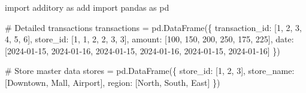 \documentclass[
  letterpaper,
]{scrbook}
\newenvironment{Shaded}{\begin{snugshade}}{\end{snugshade}}
\newcommand{\CommentTok}[1]{\textcolor[rgb]{0.37,0.37,0.37}{#1}}
\newcommand{\DecValTok}[1]{\textcolor[rgb]{0.68,0.00,0.00}{#1}}
\newcommand{\ImportTok}[1]{\textcolor[rgb]{0.00,0.46,0.62}{#1}}
\newcommand{\NormalTok}[1]{\textcolor[rgb]{0.00,0.23,0.31}{#1}}
\newcommand{\OperatorTok}[1]{\textcolor[rgb]{0.37,0.37,0.37}{#1}}
\newcommand{\StringTok}[1]{\textcolor[rgb]{0.13,0.47,0.30}{#1}}
\begin{document}
\begin{Shaded}
\begin{Highlighting}[]
\ImportTok{import}\NormalTok{ additory }\ImportTok{as}\NormalTok{ add}
\ImportTok{import}\NormalTok{ pandas }\ImportTok{as}\NormalTok{ pd}

\CommentTok{\# Detailed transactions}
\NormalTok{transactions }\OperatorTok{=}\NormalTok{ pd.DataFrame(\{}
    \StringTok{\textquotesingle{}transaction\_id\textquotesingle{}}\NormalTok{: [}\DecValTok{1}\NormalTok{, }\DecValTok{2}\NormalTok{, }\DecValTok{3}\NormalTok{, }\DecValTok{4}\NormalTok{, }\DecValTok{5}\NormalTok{, }\DecValTok{6}\NormalTok{],}
    \StringTok{\textquotesingle{}store\_id\textquotesingle{}}\NormalTok{: [}\DecValTok{1}\NormalTok{, }\DecValTok{1}\NormalTok{, }\DecValTok{2}\NormalTok{, }\DecValTok{2}\NormalTok{, }\DecValTok{3}\NormalTok{, }\DecValTok{3}\NormalTok{],}
    \StringTok{\textquotesingle{}amount\textquotesingle{}}\NormalTok{: [}\DecValTok{100}\NormalTok{, }\DecValTok{150}\NormalTok{, }\DecValTok{200}\NormalTok{, }\DecValTok{250}\NormalTok{, }\DecValTok{175}\NormalTok{, }\DecValTok{225}\NormalTok{],}
    \StringTok{\textquotesingle{}date\textquotesingle{}}\NormalTok{: [}\StringTok{\textquotesingle{}2024{-}01{-}15\textquotesingle{}}\NormalTok{, }\StringTok{\textquotesingle{}2024{-}01{-}16\textquotesingle{}}\NormalTok{, }\StringTok{\textquotesingle{}2024{-}01{-}15\textquotesingle{}}\NormalTok{, }
             \StringTok{\textquotesingle{}2024{-}01{-}16\textquotesingle{}}\NormalTok{, }\StringTok{\textquotesingle{}2024{-}01{-}15\textquotesingle{}}\NormalTok{, }\StringTok{\textquotesingle{}2024{-}01{-}16\textquotesingle{}}\NormalTok{]}
\NormalTok{\})}

\CommentTok{\# Store master data}
\NormalTok{stores }\OperatorTok{=}\NormalTok{ pd.DataFrame(\{}
    \StringTok{\textquotesingle{}store\_id\textquotesingle{}}\NormalTok{: [}\DecValTok{1}\NormalTok{, }\DecValTok{2}\NormalTok{, }\DecValTok{3}\NormalTok{],}
    \StringTok{\textquotesingle{}store\_name\textquotesingle{}}\NormalTok{: [}\StringTok{\textquotesingle{}Downtown\textquotesingle{}}\NormalTok{, }\StringTok{\textquotesingle{}Mall\textquotesingle{}}\NormalTok{, }\StringTok{\textquotesingle{}Airport\textquotesingle{}}\NormalTok{],}
    \StringTok{\textquotesingle{}region\textquotesingle{}}\NormalTok{: [}\StringTok{\textquotesingle{}North\textquotesingle{}}\NormalTok{, }\StringTok{\textquotesingle{}South\textquotesingle{}}\NormalTok{, }\StringTok{\textquotesingle{}East\textquotesingle{}}\NormalTok{]}
\NormalTok{\})}


\end{Highlighting}
\end{Shaded}
\end{document}
